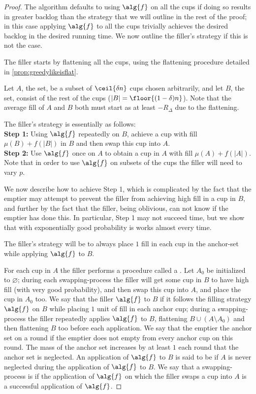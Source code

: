 \begin{proof}
The algorithm defaults to using $\alg{f}$ on all the cups if doing
so results in greater backlog than the strategy that we will
outline in the rest of the proof; in this case applying $\alg{f}$
to all the cups trivially achieves the desired backlog in the
desired running time. We now outline the filler's strategy if this is not the case.

  The filler starts by flattening all the cups, using the flattening procedure
  detailed in \cref{prop:greedylikeisflat}. 

  Let $A$, the  set, be a subset of $\ceil{\delta n}$ cups
  chosen arbitrarily, and let $B$, the  set,
  consist of the rest of the cups ($|B| = \floor{(1-\delta)n}$). Note
  that the average fill of $A$ and $B$ both must start as at
  least $-R_\Delta$ due to the flattening. 

  The filler's strategy is essentially as follows:\\
  \textbf{Step 1:} Using $\alg{f}$ repeatedly on $B$, achieve a
  cup with fill $\mu(B) + f(|B|)$ in $B$ and then swap this cup into $A$. \\
  \textbf{Step 2:} Use $\alg{f}$ once on $A$ to obtain a cup in
  $A$ with fill $\mu(A) + f(|A|)$.\\
  Note that in order to use $\alg{f}$ on subsets of the cups the filler will need to vary $p$.

  We now describe how to achieve Step 1, which is complicated by
  the fact that the emptier may attempt to prevent the filler
  from achieving high fill in a cup in $B$, and further by the
  fact that the filler, being oblivious, can not know if the
  emptier has done this. In particular, Step 1 may not succeed
  time, but we show that with exponentially good probability is
  works almost every time.

  The filler's strategy will be to always place $1$ fill in each cup in the
  anchor-set while applying $\alg{f}$ to $B$.

  For each cup in $A$ the filler performs a procedure called a
  . Let $A_0$ be initialized to
  $\varnothing$; during each swapping-process the filler will get
  some cup in $B$ to have high fill (with very good probability),
  and then swap this cup into $A$, and place the cup in $A_0$ too.
  We say that the filler 
  $\alg{f}$ to $B$ if it follows the filling strategy $\alg{f}$ on
  $B$ while placing $1$ unit of fill in each anchor cup; during a
  swapping-process the filler repeatedly applies $\alg{f}$ to $B$,
  flattening $B \cup (A\setminus A_0)$ and then flattening $B$
  too before each application.
  We say that the emptier  the anchor set on a
  round if the emptier does not empty from every anchor cup on
  this round. The mass of the anchor set increases by at least
  $1$ each round that the anchor set is neglected. An application
  of $\alg{f}$ to $B$ is said to be  if $A$ is
  never neglected during the application of $\alg{f}$ to $B$. We
  say that a swapping-process is  if the application of
  $\alg{f}$ on which the filler swaps a cup into $A$ is a
  successful application of $\alg{f}$.


\end{proof}
